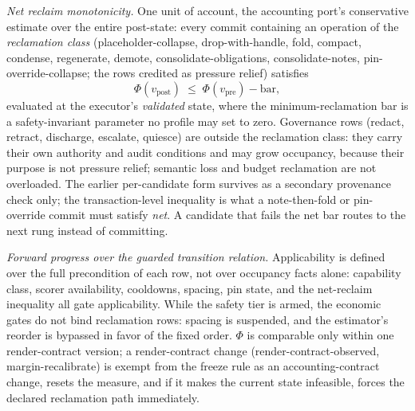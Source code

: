 \documentclass[11pt]{article}
\begin{document}
\emph{Net reclaim monotonicity.} One unit of account, the accounting port's conservative estimate over the entire post-state: every commit containing an operation of the \emph{reclamation class} (placeholder-collapse, drop-with-handle, fold, compact, condense, regenerate, demote, consolidate-obligations, consolidate-notes, pin-override-collapse; the rows credited as pressure relief) satisfies
\[
\Phi(v_{\mathrm{post}}) \;\le\; \Phi(v_{\mathrm{pre}}) - \mathrm{bar},
\]
evaluated at the executor's \emph{validated} state, where the minimum-reclamation bar is a safety-invariant parameter no profile may set to zero. Governance rows (redact, retract, discharge, escalate, quiesce) are outside the reclamation class: they carry their own authority and audit conditions and may grow occupancy, because their purpose is not pressure relief; semantic loss and budget reclamation are not overloaded. The earlier per-candidate form survives as a secondary provenance check only; the transaction-level inequality is what a note-then-fold or pin-override commit must satisfy \emph{net}. A candidate that fails the net bar routes to the next rung instead of committing.

\emph{Forward progress over the guarded transition relation.} Applicability is defined over the full precondition of each row, not over occupancy facts alone: capability class, scorer availability, cooldowns, spacing, pin state, and the net-reclaim inequality all gate applicability. While the safety tier is armed, the economic gates do not bind reclamation rows: spacing is suspended, and the estimator's reorder is bypassed in favor of the fixed order. $\Phi$ is comparable only within one render-contract version; a render-contract change (render-contract-observed, margin-recalibrate) is exempt from the freeze rule as an accounting-contract change, resets the measure, and if it makes the current state infeasible, forces the declared reclamation path immediately.
\end{document}
